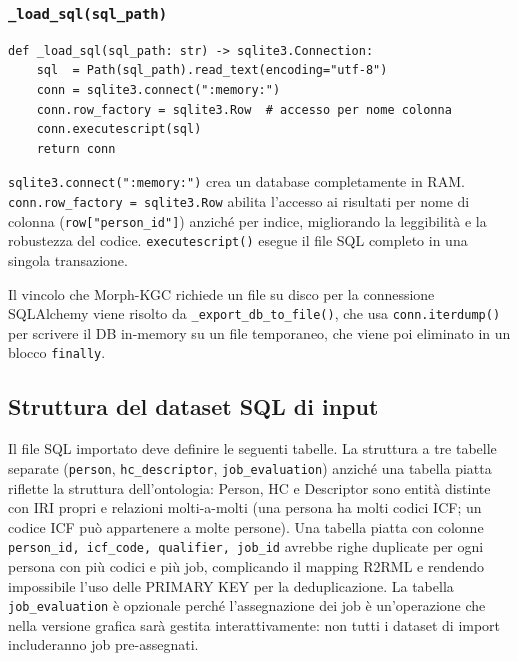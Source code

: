 \documentclass[a4paper,12pt]{article}
\begin{document}
\subsubsection{\texttt{\_load\_sql(sql\_path)}}

\begin{lstlisting}[caption={Caricamento del dataset SQL in SQLite in-memory.}]
def _load_sql(sql_path: str) -> sqlite3.Connection:
    sql  = Path(sql_path).read_text(encoding="utf-8")
    conn = sqlite3.connect(":memory:")
    conn.row_factory = sqlite3.Row  # accesso per nome colonna
    conn.executescript(sql)
    return conn
\end{lstlisting}

\noindent \texttt{sqlite3.connect(":memory:")} crea un database completamente in RAM.
\texttt{conn.row\_\allowbreak{}factory = sqlite3.Row} abilita l'accesso ai risultati
per nome di colonna (\texttt{row["person\_id"]}) anzich\'{e} per indice,
migliorando la leggibilit\`{a} e la robustezza del codice.
\texttt{executescript()} esegue il file SQL completo in una singola
transazione.

Il vincolo che Morph-KGC richiede un file su disco per la connessione
SQLAlchemy viene risolto da \texttt{\_export\_db\_to\_file()}, che usa
\texttt{conn.iterdump()} per scrivere il DB in-memory su un file
temporaneo, che viene poi eliminato in un blocco \texttt{finally}.

\subsection{Struttura del dataset SQL di input}

Il file SQL importato deve definire le seguenti tabelle. La struttura
a tre tabelle separate (\texttt{person}, \texttt{hc\_descriptor},
\texttt{job\_evaluation}) anzich\'{e} una tabella piatta riflette la
struttura dell'ontologia: Person, HC e Descriptor sono entit\`{a}
distinte con IRI propri e relazioni molti-a-molti (una persona ha
molti codici ICF; un codice ICF pu\`{o} appartenere a molte persone).
Una tabella piatta con colonne \texttt{person\_\allowbreak{}id, icf\_\allowbreak{}code, qualifier, job\_\allowbreak{}id}
avrebbe righe duplicate per ogni persona con pi\`{u} codici e pi\`{u} job,
complicando il mapping R2RML e rendendo impossibile l'uso delle
PRIMARY KEY per la deduplicazione. La tabella \texttt{job\_evaluation}
\`{e} opzionale perch\'{e} l'assegnazione dei job \`{e} un'operazione
che nella versione grafica sar\`{a} gestita interattivamente: non tutti
i dataset di import includeranno job pre-assegnati.
\end{document}
